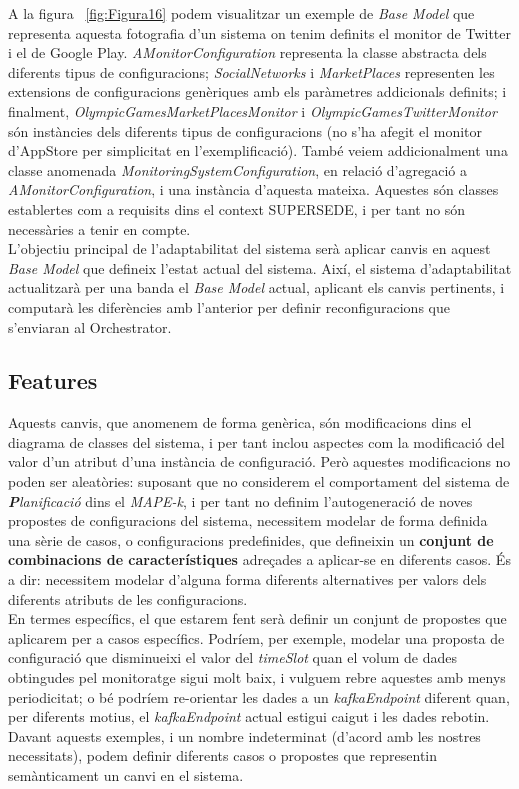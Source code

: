 A la figura ~\ref{fig:Figura16} podem visualitzar un exemple de \textit{Base Model} que representa aquesta fotografia d'un sistema on tenim definits el monitor de Twitter i el de Google Play. \textit{AMonitorConfiguration} representa la classe abstracta dels diferents tipus de configuracions; \textit{SocialNetworks} i \textit{MarketPlaces} representen les extensions de configuracions genèriques amb els paràmetres addicionals definits; i finalment, \textit{OlympicGamesMarketPlacesMonitor} i \textit{OlympicGamesTwitterMonitor} són instàncies dels diferents tipus de configuracions (no s'ha afegit el monitor d'AppStore per simplicitat en l'exemplificació). També veiem addicionalment una classe anomenada \textit{MonitoringSystemConfiguration}, en relació d'agregació a \textit{AMonitorConfiguration}, i una instància d'aquesta mateixa. Aquestes són classes establertes com a requisits dins el context SUPERSEDE, i per tant no són necessàries a tenir en compte.\\

L'objectiu principal de l'adaptabilitat del sistema serà aplicar canvis en aquest \textit{Base Model} que defineix l'estat actual del sistema. Així, el sistema d'adaptabilitat actualitzarà per una banda el \textit{Base Model} actual, aplicant els canvis pertinents, i computarà les diferències amb l'anterior per definir reconfiguracions que s'enviaran al Orchestrator.

\subsection{Features}

Aquests canvis, que anomenem de forma genèrica, són modificacions dins el diagrama de classes del sistema, i per tant inclou aspectes com la modificació del valor d'un atribut d'una instància de configuració. Però aquestes modificacions no poden ser aleatòries: suposant que no considerem el comportament del sistema de \textit{\textbf{P}lanificació} dins el \textit{MAPE-k}, i per tant no definim l'autogeneració de noves propostes de configuracions del sistema, necessitem modelar de forma definida una sèrie de casos, o configuracions predefinides, que defineixin un \textbf{conjunt de combinacions de característiques} adreçades a aplicar-se en diferents casos. És a dir: necessitem modelar d'alguna forma diferents alternatives per valors dels diferents atributs de les configuracions.\\
 
En termes específics, el que estarem fent serà definir un conjunt de propostes que aplicarem per a casos específics. Podríem, per exemple, modelar una proposta de configuració que disminueixi el valor del \textit{timeSlot} quan el volum de dades obtingudes pel monitoratge sigui molt baix, i vulguem rebre aquestes amb menys periodicitat; o bé podríem re-orientar les dades a un \textit{kafkaEndpoint} diferent quan, per diferents motius, el \textit{kafkaEndpoint} actual estigui caigut i les dades rebotin. Davant aquests exemples, i un nombre indeterminat (d'acord amb les nostres necessitats), podem definir diferents casos o propostes que representin semànticament un canvi en el sistema.\\


